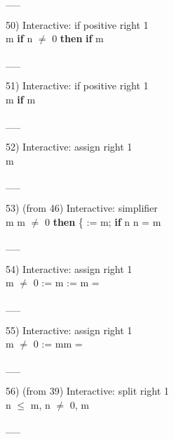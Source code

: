 \documentclass[a4paper]{article}
\begin{document}
\vspace{-1.5ex}\_\hrulefill \_

50) Interactive: if positive right  1\\
\tabf m %
\Fol \Do 
{\bf if} n $\neq$ 0 {\bf then} 
{\bf if} m %

\vspace{-1.5ex}\_\hrulefill \_

51) Interactive: if positive right  1\\
m %
{\bf if} m %

\vspace{-1.5ex}\_\hrulefill \_

52) Interactive: assign right  1\\
m %

\vspace{-1.5ex}\_\hrulefill \_

53)  (from 46) Interactive: simplifier \\
\tabf m %
\Fol {} m $\neq$ 0 {\bf then} \{ := m; {\bf if} n %
n = m

\vspace{-1.5ex}\_\hrulefill \_

54) Interactive: assign right  1\\
m $\neq$ 0 \Fol \Do {} := m\Dc \Do {} := \Dc m = 

\vspace{-1.5ex}\_\hrulefill \_

55) Interactive: assign right  1\\
m $\neq$ 0 \Fol \Do {} := m\Dc m = 

\vspace{-1.5ex}\_\hrulefill \_

56)  (from 39) Interactive: split right  1\\
n $\le$ m, n $\neq$ 0, m %

\vspace{-1.5ex}\_\hrulefill \_
\end{document}

